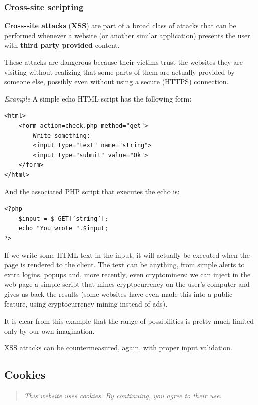 \subsubsection{Cross-site scripting}
\textbf{Cross-site attacks} (\textbf{XSS}) are part of a broad class of attacks that can be performed whenever a website (or another similar application) presents the user with \textbf{third party provided} content.

These attacks are dangerous because their victims trust the websites they are visiting without realizing that some parts of them are actually provided by someone else, possibly even without using a secure (HTTPS) connection.

\vspace{0.5em}

\emph{Example} A simple echo HTML script has the following form:
\begin{verbatim}
<html>
    <form action=check.php method="get">
        Write something:
        <input type="text" name="string">
        <input type="submit" value="Ok">
    </form>
</html>
\end{verbatim}

And the associated PHP script that executes the echo is:

\begin{verbatim}
<?php
    $input = $_GET[’string’];
    echo "You wrote ".$input;
?>
\end{verbatim}

If we write some HTML text in the input, it will actually be executed when the page is rendered to the client. The text can be anything, from simple alerts to extra logins, popups and, more recently, even cryptominers: we can inject in the web page a simple script that mines cryptocurrency on the user's computer and gives us back the results (some websites have even made this into a public feature, using cryptocurrency mining instead of ads).

\vspace{0.5em}

It is clear from this example that the range of possibilities is pretty much limited only by our own imagination.

XSS attacks can be countermeasured, again, with proper input validation.

\subsection{Cookies}
\begin{quote}
    \centering
    \emph{This website uses cookies. By continuing, you agree to their use.}
\end{quote}

